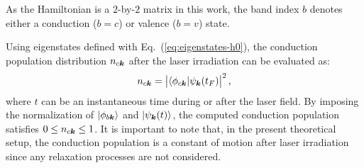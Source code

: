 As the Hamiltonian is a $2$-by-$2$ matrix in this work, the band index $b$ denotes either a conduction ($b=c$) or valence ($b=v$) state.

Using eigenstates defined with Eq.~(\ref{eq:eigenstates-h0}), the conduction population distribution $n_{c \boldsymbol{k}}$ after the laser irradiation can be evaluated as:
\begin{align}
	n_{c\boldsymbol{k}} = \left | \langle \phi_{c \boldsymbol{k}} | \psi_{\boldsymbol{k}}(t_F) \right |^2,
	\label{eq:population_tdse}
\end{align}
where $t$ can be an instantaneous time during or after the laser field. By imposing the normalization of $|\phi_{b \boldsymbol{k}}\rangle$ and $|\psi_{\boldsymbol{k}}(t)\rangle$, the computed conduction population satisfies $0\le n_{c \boldsymbol{k}}\le 1$. It is important to note that, in the present theoretical setup, the conduction population is a constant of motion after laser irradiation since any relaxation processes are not considered.

